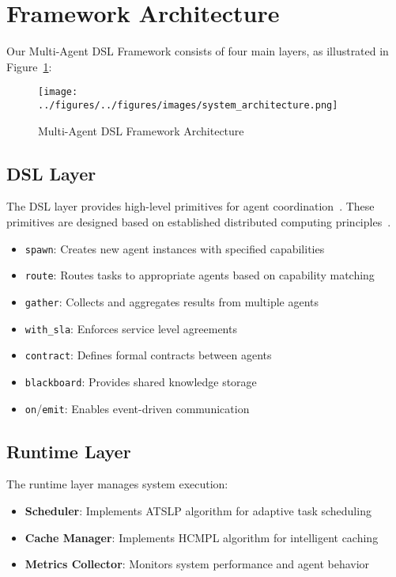 \documentclass[conference]{IEEEtran}
\begin{document}
\section{Framework Architecture}

Our Multi-Agent DSL Framework consists of four main layers, as illustrated in Figure~\ref{fig:architecture}:

\begin{figure}[htbp]
\centering
\texttt{[image: ../figures/../figures/images/system\_architecture.png]}
\caption{Multi-Agent DSL Framework Architecture}
\label{fig:architecture}
\end{figure}

\subsection{DSL Layer}

The DSL layer provides high-level primitives for agent coordination~\cite{herlihy2012art,attiya2004distributed}. These primitives are designed based on established distributed computing principles~\cite{musa2004software}.

\begin{itemize}
\item \texttt{spawn}: Creates new agent instances with specified capabilities
\item \texttt{route}: Routes tasks to appropriate agents based on capability matching
\item \texttt{gather}: Collects and aggregates results from multiple agents
\item \texttt{with\_sla}: Enforces service level agreements
\item \texttt{contract}: Defines formal contracts between agents
\item \texttt{blackboard}: Provides shared knowledge storage
\item \texttt{on}/\texttt{emit}: Enables event-driven communication
\end{itemize}

\subsection{Runtime Layer}

The runtime layer manages system execution:

\begin{itemize}
\item \textbf{Scheduler}: Implements ATSLP algorithm for adaptive task scheduling
\item \textbf{Cache Manager}: Implements HCMPL algorithm for intelligent caching
\item \textbf{Metrics Collector}: Monitors system performance and agent behavior
\end{itemize}
\end{document}
